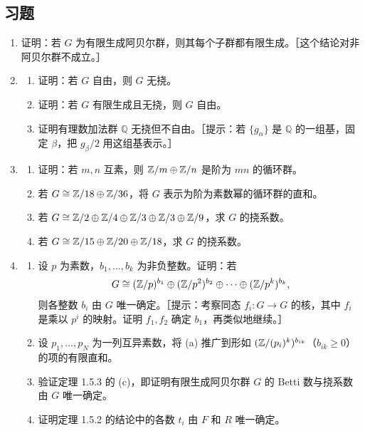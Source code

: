 \subsection*{习题}
\begin{enumerate}
\item 证明：若 $G$ 为有限生成阿贝尔群，则其每个子群都有限生成。［这个结论对非阿贝尔群不成立。］
\item \begin{enumerate}[label=(\alph*)]
\item 证明：若 $G$ 自由，则 $G$ 无挠。
\item 证明：若 $G$ 有限生成且无挠，则 $G$ 自由。
\item 证明有理数加法群 $\mathbb Q$ 无挠但不自由。［提示：若 $\{g_\alpha\}$ 是 $\mathbb Q$ 的一组基，固定 $\beta$，把 $g_\beta/2$ 用这组基表示。］
\end{enumerate}
\item \begin{enumerate}[label=(\alph*)]
\item 证明：若 $m,n$ 互素，则 $\mathbb{Z}/m\oplus\mathbb{Z}/n$ 是阶为 $mn$ 的循环群。
\item 若 $G\cong\mathbb{Z}/18\oplus\mathbb{Z}/36$，将 $G$ 表示为阶为素数幂的循环群的直和。
\item 若 $G\cong\mathbb{Z}/2\oplus\mathbb{Z}/4\oplus\mathbb{Z}/3\oplus\mathbb{Z}/3\oplus\mathbb{Z}/9$，求 $G$ 的挠系数。
\item 若 $G\cong\mathbb{Z}/15\oplus\mathbb{Z}/20\oplus\mathbb{Z}/18$，求 $G$ 的挠系数。
\end{enumerate}
\item \begin{enumerate}[label=(\alph*)]
\item 设 $p$ 为素数，$b_1,\ldots,b_k$ 为非负整数。证明：若
\[
G\cong(\mathbb{Z}/p)^{b_1}\oplus(\mathbb{Z}/p^2)^{b_2}\oplus\cdots\oplus(\mathbb{Z}/p^k)^{b_k},
\]
则各整数 $b_i$ 由 $G$ 唯一确定。［提示：考察同态 $f_i:G\to G$ 的核，其中 $f_i$ 是乘以 $p^i$ 的映射。证明 $f_1,f_2$ 确定 $b_1$，再类似地继续。］
\item 设 $p_1,\ldots,p_N$ 为一列互异素数，将 (a) 推广到形如 $(\mathbb{Z}/(p_i)^k)^{b_{ik}}$（$b_{ik}\geq0$）的项的有限直和。
\item 验证定理 1.5.3 的 (c)，即证明有限生成阿贝尔群 $G$ 的 Betti 数与挠系数由 $G$ 唯一确定。
\item 证明定理 1.5.2 的结论中的各数 $t_i$ 由 $F$ 和 $R$ 唯一确定。
\end{enumerate}
\end{enumerate}
